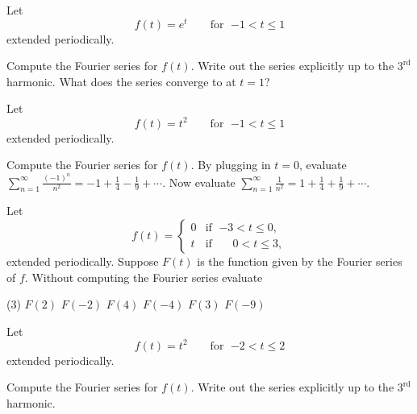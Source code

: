 \begin{exercise}
Let
\begin{equation*}
f(t) = e^t \qquad \text{for } \; {-1} < t \leq 1
\end{equation*}
extended periodically.
\begin{tasks}
\task Compute the Fourier series for $f(t)$.
\task Write out the series explicitly up to the $3^{\text{rd}}$ harmonic.
\task What does the series converge to at $t=1$?
\end{tasks}
\end{exercise}

\begin{exercise}
\pagebreak[2]
Let
\begin{equation*}
f(t) = t^2 \qquad \text{for } \; {-1} < t \leq 1
\end{equation*}
extended periodically.
\begin{tasks}
\task Compute the Fourier series for $f(t)$.
\task By plugging in $t=0$,
evaluate $\displaystyle \sum_{n=1}^\infty \frac{{(-1)}^n}{n^2} = -1 + \frac{1}{4} -
\frac{1}{9} + \cdots$.
\task Now evaluate $\displaystyle \sum_{n=1}^\infty \frac{1}{n^2} = 1 + \frac{1}{4} +
\frac{1}{9} + \cdots$.
\end{tasks}
\end{exercise}

\begin{exercise}
Let
\begin{equation*}
f(t) =
\begin{cases}
0 & \text{if } \; {-3} < t \leq 0, \\
t & \text{if } \; \phantom{-}0 < t \leq 3,
\end{cases}
\end{equation*}
extended periodically.  Suppose $F(t)$ is the function given
by the Fourier series of $f$.  Without computing the Fourier series
evaluate
\begin{tasks}(3)
\task $F(2)$
\task $F(-2)$
\task $F(4)$
\task $F(-4)$
\task $F(3)$
\task $F(-9)$
\end{tasks}
\end{exercise}

\setcounter{exercise}{100}

\begin{exercise}
Let
\begin{equation*}
f(t) = t^2 \qquad \text{for } \; {-2} < t \leq 2
\end{equation*}
extended periodically.
\begin{tasks}
\task Compute the Fourier series for $f(t)$.
\task Write out the series explicitly up to the $3^{\text{rd}}$ harmonic.
\end{tasks}
\end{exercise}

